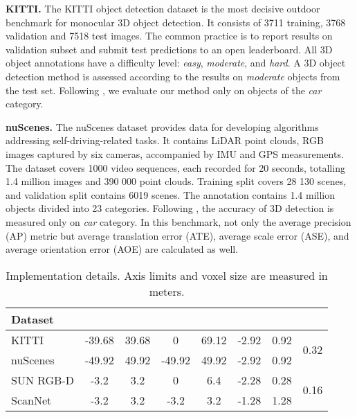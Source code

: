 \documentclass[10pt,twocolumn,letterpaper]{article}
\begin{document}
\textbf{KITTI.} The KITTI object detection dataset \cite{geiger2012kitti} is the most decisive outdoor benchmark for monocular 3D object detection. It consists of 3711 training, 3768 validation and 7518 test images. The common practice \cite{simonelli2020disentangling, liu2020smoke} is to report results on validation subset and submit test predictions to an open leaderboard. All 3D object annotations have a difficulty level: \textit{easy}, \textit{moderate}, and \textit{hard}. A 3D object detection method is assessed according to the results on \textit{moderate} objects from the test set. Following \cite{simonelli2020disentangling, liu2020smoke}, we evaluate our method only on objects of the \textit{car} category.

\textbf{nuScenes.} The nuScenes dataset \cite{caesar2020nuscenes} provides data for developing algorithms addressing self-driving-related tasks. It contains LiDAR point clouds, RGB images captured by six cameras, accompanied by IMU and GPS measurements. The dataset covers 1000 video sequences, each recorded for 20 seconds, totalling 1.4 million images and 390 000 point clouds. Training split covers 28 130 scenes, and validation split contains 6019 scenes. The annotation contains 1.4 million objects divided into 23 categories. Following \cite{simonelli2020disentangling}, the accuracy of 3D detection is measured only on \textit{car} category. In this benchmark, not only the average precision (AP) metric but average translation error (ATE), average scale error (ASE), and average orientation error (AOE) are calculated as well.

\begin{table}[!ht]
    \centering \small
    \begingroup \setlength{\tabcolsep}{2pt}
    \begin{tabular}{l|cccccc|c}
    \hline
    Dataset &  &  &  &  &  &  &  \\ \hline
    KITTI & -39.68 & 39.68 & 0 & 69.12 & -2.92 & 0.92 & \multirow[c]{2}{*}{0.32} \\
    nuScenes & -49.92 & 49.92 & -49.92 & 49.92 & -2.92 & 0.92 & \\
    SUN RGB-D & -3.2 & 3.2 & 0 & 6.4 & -2.28 & 0.28 & \multirow[c]{2}{*}{0.16} \\
    ScanNet & -3.2 & 3.2 & -3.2 & 3.2 & -1.28 & 1.28 & \\ \hline
    \end{tabular} \endgroup
    \caption{Implementation details. Axis limits and voxel size  are measured in meters.}
    \label{tab:implementation}
\end{table}
\end{document}
